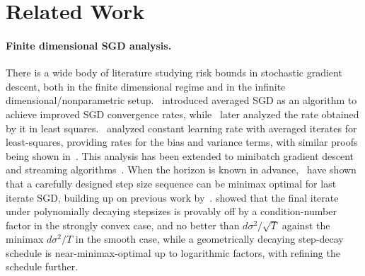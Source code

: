 \documentclass{article}
\theoremstyle{plain}
\begin{document}
\section{Related Work}
\label{sec:related_work}
\paragraph{Finite dimensional SGD analysis.} There is a wide body of literature studying risk bounds in stochastic gradient descent, both in the finite dimensional regime and in the infinite dimensional/nonparametric setup.~\citet{polyak1992acceleration} introduced averaged SGD as an algorithm to achieve improved SGD convergence rates, while~\citet{bach2013non} later analyzed the rate obtained by it in least squares.~\citet{defossez2015averaged} analyzed constant learning rate with averaged iterates for least-squares, providing rates for the bias and variance terms, with similar proofs being shown in~\citet{jain2017markov,dieuleveut2016nonparametric}. This analysis has been extended to minibatch gradient descent~\citep{jain2018parallelizing} and streaming algorithms~\citep{frostig2015competing}. When the horizon is known in advance,~\citet{jain2019making} have shown that a carefully designed step size sequence can be minimax optimal for last iterate SGD, building up on previous work by~\citet{shamir2013stochastic,harvey2019tight}. \citet{ge2019step} showed that the final iterate under polynomially decaying
stepsizes is provably off by a
condition-number factor in the strongly convex case, and no better than
$d\sigma^2/\sqrt{T}$ against the minimax $d\sigma^2/T$ in the smooth case, while a geometrically decaying step-decay schedule is
near-minimax-optimal up to logarithmic factors, with
\citet{pan2021eigencurve} refining the schedule further.
\end{document}
